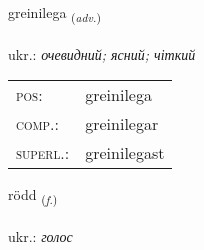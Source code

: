 \documentclass[frontgrid, backgrid]{flacards}\usepackage[]{graphicx}\usepackage[]{xcolor}
\begin{document}
\renewcommand{\flhead}{\vskip5pt \fboxsep=0pt {\small\bfseries\footnotesize Atviksorð | прислівник}}
\renewcommand{\fcfoot}{\vskip5pt \fboxsep=0pt \hspace{2pt}{\small\bfseries\footnotesize 2K}}

\renewcommand{\blhead}{\vskip5pt {\small\bfseries\footnotesize Atviksorð | прислівник }}
\renewcommand{\bcfoot}{\vskip5pt \hspace{2pt}{\small\bfseries\footnotesize 2K}}


{greinilega \small{\textsubscript{(\textit{adv.})}} \\[1ex] %
\textphonetic{[kreiːnɪlɛɣa]} \\
ukr.: \emph{очевидний; ясний; чіткий} \\  [2ex]
\renewcommand*{\arraystretch}{0.8}
\begin{tabular}{ll}
\textsc{pos}: & greinilega \\ 
\textsc{comp.}: & greinilegar \\ 
\textsc{superl.}: & greinilegast \\
\end{tabular}
}

\renewcommand{\flhead}{\vskip5pt \fboxsep=0pt {\small\bfseries\footnotesize Nafnorð | іменник}}
\renewcommand{\fcfoot}{\vskip5pt \fboxsep=0pt \hspace{2pt}{\small\bfseries\footnotesize 2K}}

\renewcommand{\blhead}{\vskip5pt {\small\bfseries\footnotesize Nafnorð | іменник }}
\renewcommand{\bcfoot}{\vskip5pt \hspace{2pt}{\small\bfseries\footnotesize 2K}}


{rödd \small{\textsubscript{(\textit{f.})}} \\[1ex] %
\textphonetic{[rœt]} \\
ukr.: \emph{голос} \\  [2ex]
\renewcommand*{\arraystretch}{0.8}
}
\end{document}
